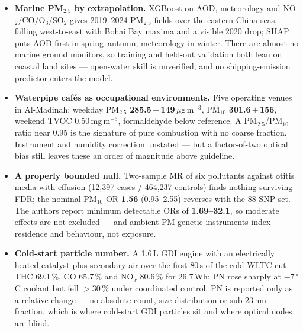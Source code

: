 \documentclass[10pt]{article}
\begin{document}
\footnotesize
\begin{itemize}

\item \textbf{Marine PM$_{2.5}$ by extrapolation.} XGBoost on AOD, meteorology and NO$_2$/CO/O$_3$/SO$_2$ gives
2019--2024 PM$_{2.5}$ fields over the eastern China seas, falling west-to-east with Bohai Bay maxima and a
visible 2020 drop; SHAP puts AOD first in spring--autumn, meteorology in winter. There are almost no marine
ground monitors, so training and held-out validation both lean on coastal land sites --- open-water skill is
unverified, and no shipping-emission predictor enters the model.

\item \textbf{Waterpipe caf\'es as occupational environments.} Five operating venues in Al-Madinah:
weekday PM$_{2.5}$ \textbf{285.5\,$\pm$\,149}\,$\mu$g\,m$^{-3}$, PM$_{10}$ \textbf{301.6\,$\pm$\,156},
weekend TVOC 0.50\,mg\,m$^{-3}$, formaldehyde below reference. A PM$_{2.5}$/PM$_{10}$ ratio near 0.95 is the
signature of pure combustion with no coarse fraction. Instrument and humidity correction unstated --- but a
factor-of-two optical bias still leaves these an order of magnitude above guideline.

\item \textbf{A properly bounded null.} Two-sample MR of six pollutants against otitis media with effusion
(12,397 cases / 464,237 controls) finds nothing surviving FDR; the nominal PM$_{10}$ OR \textbf{1.56}
(0.95--2.55) reverses with the 88-SNP set. The authors report minimum detectable ORs of \textbf{1.69--32.1},
so moderate effects are not excluded --- and ambient-PM genetic instruments index residence and behaviour,
not exposure.

\item \textbf{Cold-start particle number.} A 1.6\,L GDI engine with an electrically heated catalyst plus
secondary air over the first 80\,s of the cold WLTC cut THC 69.1\,\%, CO 65.7\,\% and NO$_x$ 80.6\,\% for
26.7\,Wh; PN rose sharply at $-7\,^\circ$C coolant but fell $>$30\,\% under coordinated control. PN is
reported only as a relative change --- no absolute count, size distribution or sub-23\,nm fraction, which is
where cold-start GDI particles sit and where optical nodes are blind.

\end{itemize}

\vspace{2mm}
\end{document}
